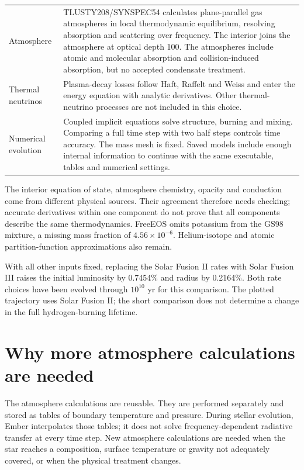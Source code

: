 \documentclass[11pt,letterpaper]{article}
\begin{document}
\begin{longtable}{@{}>{\raggedright\arraybackslash}p{}>{\raggedright\arraybackslash}p{}@{}}
Atmosphere & TLUSTY208/SYNSPEC54 calculates plane-parallel gas atmospheres in
local thermodynamic equilibrium, resolving absorption and scattering over
frequency. The interior joins the atmosphere at optical depth 100. The
atmospheres include atomic and molecular absorption and collision-induced
absorption, but no accepted condensate treatment. \\[5pt]
Thermal neutrinos & Plasma-decay losses follow Haft, Raffelt and Weiss
\cite{hrw94} and enter the energy equation with analytic derivatives. Other
thermal-neutrino processes are not included in this choice. \\[5pt]
Numerical evolution & Coupled implicit equations solve structure, burning and
mixing. Comparing a full time step with two half steps controls time accuracy.
The mass mesh is fixed. Saved models include enough internal information to
continue with the same executable, tables and numerical settings. \\
\bottomrule\end{longtable}

The interior equation of state, atmosphere chemistry, opacity and conduction
come from different physical sources. Their agreement therefore needs checking;
accurate derivatives within one component do not prove that all components
describe the same thermodynamics. FreeEOS omits potassium from the GS98 mixture,
a missing mass fraction of $4.56\times10^{-6}$. Helium-isotope and atomic
partition-function approximations also remain.

With all other inputs fixed, replacing the Solar Fusion II rates with
Solar Fusion III \cite{acharya25} raises the initial luminosity by 0.7454\%
and radius by 0.2164\%. Both rate choices have been evolved through
$10^{10}$ yr for this comparison. The plotted trajectory uses Solar Fusion II;
the short comparison does not determine a change in the full hydrogen-burning
lifetime.

\section{Why more atmosphere calculations are needed}
The atmosphere calculations are reusable. They are performed
separately and stored as tables of boundary temperature and pressure. During
stellar evolution, Ember interpolates those tables; it does not solve
frequency-dependent radiative transfer at every time step. New atmosphere
calculations are needed when the star reaches a composition, surface
temperature or gravity not adequately covered, or when the physical treatment
changes.
\end{document}
